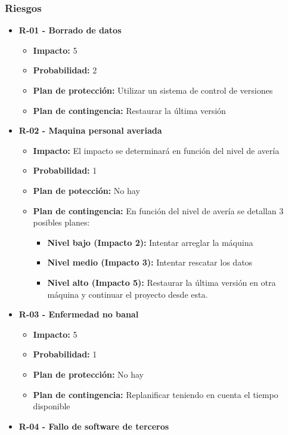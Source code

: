 \documentclass[openright,twoside,10pt]{book}
\providecommand{\tightlist}{%
  \setlength{\itemsep}{0pt}\setlength{\parskip}{0pt}}
\begin{document}
    \subsubsection{Riesgos}\label{riesgos}
    
    \begin{itemize}
    \tightlist
    \item
      \textbf{R-01 - Borrado de datos}
    
      \begin{itemize}
      \tightlist
      \item
        \textbf{Impacto:} 5
      \item
        \textbf{Probabilidad:} 2
      \item
        \textbf{Plan de protección:} Utilizar un sistema de control de
        versiones
      \item
        \textbf{Plan de contingencia:} Restaurar la última versión
      \end{itemize}
    \item
      \textbf{R-02 - Maquina personal averiada}
    
      \begin{itemize}
      \tightlist
      \item
        \textbf{Impacto:} El impacto se determinará en función del nivel de
        avería
      \item
        \textbf{Probabilidad:} 1
      \item
        \textbf{Plan de potección:} No hay
      \item
        \textbf{Plan de contingencia:} En función del nivel de avería se
        detallan 3 posibles planes:
    
        \begin{itemize}
        \tightlist
        \item
          \textbf{Nivel bajo (Impacto 2):} Intentar arreglar la máquina
        \item
          \textbf{Nivel medio (Impacto 3):} Intentar rescatar los datos
        \item
          \textbf{Nivel alto (Impacto 5):} Restaurar la última versión en
          otra máquina y continuar el proyecto desde esta.
        \end{itemize}
      \end{itemize}
    \item
      \textbf{R-03 - Enfermedad no banal}
    
      \begin{itemize}
      \tightlist
      \item
        \textbf{Impacto:} 5
      \item
        \textbf{Probabilidad:} 1
      \item
        \textbf{Plan de protección:} No hay
      \item
        \textbf{Plan de contingencia:} Replanificar teniendo en cuenta el
        tiempo disponible
      \end{itemize}
    \item
      \textbf{R-04 - Fallo de software de terceros}
    

\end{itemize}
\end{document}
